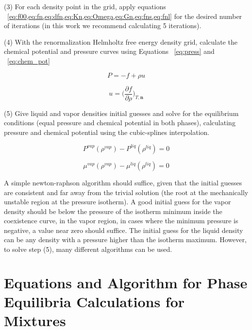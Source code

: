 \documentclass[preprint,12pt,3p]{elsarticle}
\providecommand{\DIFaddbegin}{} %
\providecommand{\DIFaddend}{} %
\providecommand{\DIFdelbegin}{} %
\providecommand{\DIFdelend}{} %
\begin{document}
\begin{appendices}
	(3) For each density point in the grid, apply equations ~\cref{eq:f00,eq:fn,eq:dfn,eq:Kn,eq:Omega,eq:Gn,eq:fns,eq:fnl} for the desired number of iterations (in this work we recommend calculating 5 iterations).

	(4) With the renormalization Helmholtz free energy density grid, calculate the chemical potential and pressure curves using Equations ~\ref{eq:press} and ~\ref{eq:chem_pot}

\begin{equation} \label{eq:press}
    P = -f+\rho u
\end{equation}

\begin{equation} \label{eq:chem_pot}
    u = \DIFdelbegin %
\DIFdelend \DIFaddbegin \Big(\DIFaddend \frac{\partial f}{\partial \rho}\DIFdelbegin %
\DIFdelend \DIFaddbegin \Big)\DIFaddend _{T,\textbf{n}}
\end{equation}

	(5) Give liquid and vapor densities initial guesses and solve for the equilibrium conditions (equal pressure and chemical potential in both phases), calculating pressure and chemical potential using the cubic-splines interpolation.

\begin{equation} \label{eq:equal_press}
	P^{vap}(\rho^{vap}) - P^{liq}(\rho^{liq}) = 0
\end{equation}

\begin{equation} \label{eq:equal_chem_pot}
	\mu^{vap}(\rho^{vap}) - \mu^{liq}(\rho^{liq}) = 0
\end{equation} 

	A simple newton-raphson algorithm should suffice, given that the initial guesses are consistent and far away from the trivial solution (the root at the mechanically unstable region at the pressure isotherm). A good initial guess for the vapor density should be below the pressure of the isotherm minimum inside the coexistence curve, in the vapor region, in cases where the minimum pressure is negative, a value near zero should suffice. The initial guess for the liquid density can be any density with a pressure higher than the isotherm maximum. However, to solve step (5), many different algorithms can be used.

\setcounter{equation}{0}
\section{Equations and Algorithm for Phase Equilibria Calculations for Mixtures}


\end{appendices}
\end{document}
